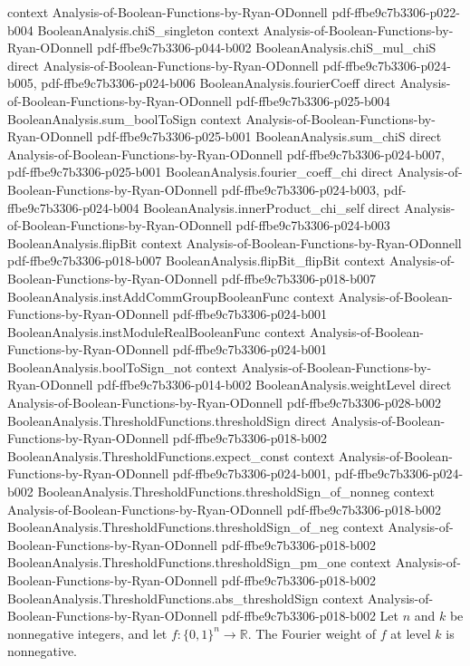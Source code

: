\begin{lemma}
  {context}
  {Analysis-of-Boolean-Functions-by-Ryan-ODonnell}
  {pdf-ffbe9c7b3306-p022-b004}
\proofstep
  {BooleanAnalysis.chiS_singleton}
  {context}
  {Analysis-of-Boolean-Functions-by-Ryan-ODonnell}
  {pdf-ffbe9c7b3306-p044-b002}
\proofstep
  {BooleanAnalysis.chiS_mul_chiS}
  {direct}
  {Analysis-of-Boolean-Functions-by-Ryan-ODonnell}
  {pdf-ffbe9c7b3306-p024-b005,
    pdf-ffbe9c7b3306-p024-b006}
\proofstep
  {BooleanAnalysis.fourierCoeff}
  {direct}
  {Analysis-of-Boolean-Functions-by-Ryan-ODonnell}
  {pdf-ffbe9c7b3306-p025-b004}
\proofstep
  {BooleanAnalysis.sum_boolToSign}
  {context}
  {Analysis-of-Boolean-Functions-by-Ryan-ODonnell}
  {pdf-ffbe9c7b3306-p025-b001}
\proofstep
  {BooleanAnalysis.sum_chiS}
  {direct}
  {Analysis-of-Boolean-Functions-by-Ryan-ODonnell}
  {pdf-ffbe9c7b3306-p024-b007,
    pdf-ffbe9c7b3306-p025-b001}
\proofstep
  {BooleanAnalysis.fourier_coeff_chi}
  {direct}
  {Analysis-of-Boolean-Functions-by-Ryan-ODonnell}
  {pdf-ffbe9c7b3306-p024-b003,
    pdf-ffbe9c7b3306-p024-b004}
\proofstep
  {BooleanAnalysis.innerProduct_chi_self}
  {direct}
  {Analysis-of-Boolean-Functions-by-Ryan-ODonnell}
  {pdf-ffbe9c7b3306-p024-b003}
\proofstep
  {BooleanAnalysis.flipBit}
  {context}
  {Analysis-of-Boolean-Functions-by-Ryan-ODonnell}
  {pdf-ffbe9c7b3306-p018-b007}
\proofstep
  {BooleanAnalysis.flipBit_flipBit}
  {context}
  {Analysis-of-Boolean-Functions-by-Ryan-ODonnell}
  {pdf-ffbe9c7b3306-p018-b007}
\proofstep
  {BooleanAnalysis.instAddCommGroupBooleanFunc}
  {context}
  {Analysis-of-Boolean-Functions-by-Ryan-ODonnell}
  {pdf-ffbe9c7b3306-p024-b001}
\proofstep
  {BooleanAnalysis.instModuleRealBooleanFunc}
  {context}
  {Analysis-of-Boolean-Functions-by-Ryan-ODonnell}
  {pdf-ffbe9c7b3306-p024-b001}
\proofstep
  {BooleanAnalysis.boolToSign_not}
  {context}
  {Analysis-of-Boolean-Functions-by-Ryan-ODonnell}
  {pdf-ffbe9c7b3306-p014-b002}
\proofstep
  {BooleanAnalysis.weightLevel}
  {direct}
  {Analysis-of-Boolean-Functions-by-Ryan-ODonnell}
  {pdf-ffbe9c7b3306-p028-b002}
\proofstep
  {BooleanAnalysis.ThresholdFunctions.thresholdSign}
  {direct}
  {Analysis-of-Boolean-Functions-by-Ryan-ODonnell}
  {pdf-ffbe9c7b3306-p018-b002}
\proofstep
  {BooleanAnalysis.ThresholdFunctions.expect_const}
  {context}
  {Analysis-of-Boolean-Functions-by-Ryan-ODonnell}
  {pdf-ffbe9c7b3306-p024-b001,
    pdf-ffbe9c7b3306-p024-b002}
\proofstep
  {BooleanAnalysis.ThresholdFunctions.thresholdSign_of_nonneg}
  {context}
  {Analysis-of-Boolean-Functions-by-Ryan-ODonnell}
  {pdf-ffbe9c7b3306-p018-b002}
\proofstep
  {BooleanAnalysis.ThresholdFunctions.thresholdSign_of_neg}
  {context}
  {Analysis-of-Boolean-Functions-by-Ryan-ODonnell}
  {pdf-ffbe9c7b3306-p018-b002}
\proofstep
  {BooleanAnalysis.ThresholdFunctions.thresholdSign_pm_one}
  {context}
  {Analysis-of-Boolean-Functions-by-Ryan-ODonnell}
  {pdf-ffbe9c7b3306-p018-b002}
\proofstep
  {BooleanAnalysis.ThresholdFunctions.abs_thresholdSign}
  {context}
  {Analysis-of-Boolean-Functions-by-Ryan-ODonnell}
  {pdf-ffbe9c7b3306-p018-b002}
Let $n$ and $k$ be nonnegative integers, and let $f:\{0,1\}^n\to\mathbb R$. The Fourier
weight of $f$ at level $k$ is nonnegative.
\end{lemma}

